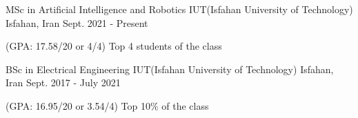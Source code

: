 

\begin{cventries}

    \cventry 
    {MSc in Artificial Intelligence and Robotics} %
    {IUT(Isfahan University of Technology)} %
    {Isfahan, Iran} %
    {Sept. 2021 - Present} %
    {
      \begin{cvitems} %
        \item {(GPA: 17.58/20 or 4/4) Top 4 students of the class}
      \end{cvitems}
    }
    \cventry
    {BSc in Electrical Engineering } %
    {IUT(Isfahan University of Technology)} %
    {Isfahan, Iran} %
    {Sept. 2017 - July 2021} %
    {
      \begin{cvitems} %
        \item {(GPA: 16.95/20 or 3.54/4) Top 10\% of the class}
      \end{cvitems}
    }

\end{cventries}
